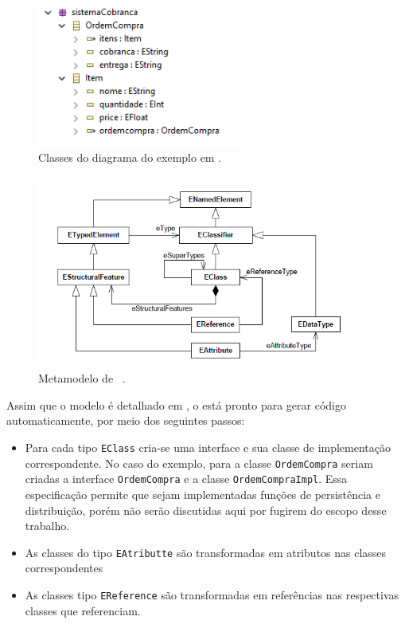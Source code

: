 \begin{figure}
	\centering
	\includegraphics[width=0.6\textwidth]{figuras/exemplos-emf/exemplo-ecore.PNG}
	\caption{Classes do diagrama do exemplo em \ecore.}
	\label{exemplo-ecore}
\end{figure}

\begin{figure}
	\centering
	\includegraphics[width=0.95\textwidth]{figuras/exemplos-emf/metamodelo-ecore.png}
	\caption{Metamodelo de \ecore~\cite{kern2008interchange}.}
	\label{metamodelo-ecore}
\end{figure}

Assim que o modelo é detalhado em \ecore, o \emf está pronto para gerar código automaticamente, por meio dos seguintes passos:

\begin{itemize}
	\item Para cada tipo \texttt{EClass} cria-se uma interface e sua classe de implementação correspondente. No caso do exemplo, para a classe \texttt{OrdemCompra} seriam criadas a interface \texttt{OrdemCompra} e a classe \texttt{OrdemCompraImpl}. Essa especificação permite que sejam implementadas funções de persistência e distribuição, porém não serão discutidas aqui por fugirem do escopo desse trabalho.
	\item As classes do tipo \texttt{EAtributte} são transformadas em atributos nas classes correspondentes
	\item As classes tipo \texttt{EReference} são transformadas em referências nas respectivas classes que referenciam.
\end{itemize}

